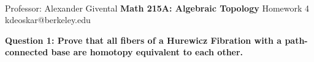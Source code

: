 \documentclass[11pt]{article}
\begin{document}
\thispagestyle{empty}
\bigskip \
\vspace{0.1cm}

\begin{center}
{\fontsize{22}{22} \selectfont Professor: Alexander Givental}
\vskip 16pt
{\fontsize{30}{30} \selectfont \bf \sffamily Math 215A: Algebraic Topology}
\vskip 24pt
{\fontsize{14}{14} \selectfont \rmfamily Homework 4} 
\vskip 6pt
{\fontsize{14}{14} \selectfont \ttfamily kdeoskar@berkeley.edu} 
\vskip 24pt
\end{center}



\begin{bluebox}
  \textbf{Question 1: Prove that all fibers of a Hurewicz Fibration with a path-connected base are homotopy equivalent to each other.} 
\end{bluebox}
\end{document}
